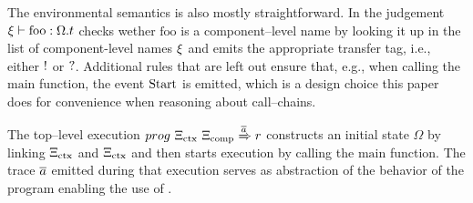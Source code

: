 \documentclass[utf8,acmsmall,review,screen,dvipsnames]{acmart}
\begin{document}
\begin{center}
\end{center}

The environmental semantics is also mostly straightforward.
In  the judgement $\xi\vdash\text{foo}:\Omega.t$ checks wether $\text{foo}$ is a component--level name by looking it up in the list of component-level names $\xi$ and emits the appropriate transfer tag, i.e., either $ ! $ or $ ? $.
Additional rules that are left out ensure that, e.g., when calling the $\text{main}$ function, the event $\text{Start}$ is emitted, which is a design choice this paper does for convenience when reasoning about call--chains.

The top--level execution $\progstepto{\prog{\library_{\ctx}}{\library_{\comp}}}{\runtimetermvar}{\trace}$ constructs an initial state $\Omega$ by linking $\Xi_{\text{ctx}}$ and $\Xi_{\text{ctx}}$ and then starts execution by calling the $\text{main}$ function.
The trace $\overline{a}$ emitted during that execution serves as abstraction of the behavior of the program enabling the use of .
\end{document}
